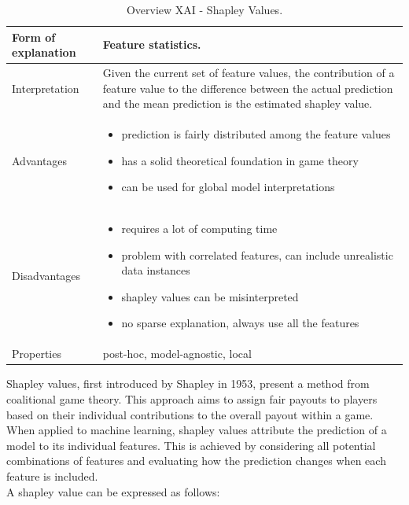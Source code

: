 \begin{table}[H]
  \centering
  \begin{tabular}{|p{}|p{}|}
    \hline
    Form of \newline explanation & 
    Feature statistics. \\
    
    \hline
    Interpretation & 
    Given the current set of feature values, the contribution of a feature value to the difference between the actual prediction and the mean prediction is the estimated shapley value. \\
    \hline
    Advantages &
    \begin{itemize}[nosep, left=0em]
        \item prediction is fairly distributed among the feature values
        \item has a solid theoretical foundation in game theory
        \item can be used for global model interpretations
    \end{itemize} \\
    
    \hline
    Disadvantages &
    \begin{itemize}[nosep, left=0em]
        \item requires a lot of computing time
        \item problem with correlated features, can include unrealistic data instances
        \item shapley values can be misinterpreted
        \item no sparse explanation, always use all the features
    \end{itemize} \\
    
    \hline
    Properties & 
    post-hoc, model-agnostic, local  \\
    
    \hline
  \end{tabular}
  \caption{Overview XAI - Shapley Values.}
  \label{tab:XAIShapVal}
\end{table}

Shapley values, first introduced by Shapley \cite{shapley1953value} in 1953, present a method from coalitional game theory. This approach aims to assign fair payouts to players based on their individual contributions to the overall payout within a game. When applied to machine learning, shapley values attribute the prediction of a model to its individual features. This is achieved by considering all potential combinations of features and evaluating how the prediction changes when each feature is included.\\
A shapley value can be expressed as follows:

